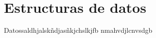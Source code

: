 \documentclass[../informe.tex]{subfiles}
\begin{document}
\section{Estructuras de datos}
\label{sec:est_datos}
Datossaldhjalskñdjasñkjchslkjfb nmahvdjlcnvsdgb
\end{document}
